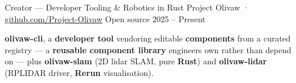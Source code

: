 
\begin{cventries}

  \cventry
  {Creator --- Developer Tooling \& Robotics in Rust}
  {Project Olivaw · \href{https://github.com/Project-Olivaw}{github.com/Project-Olivaw}}
  {Open source}
  {2025 -- Present}
  {
    \begin{cvitems}
      \item {\textbf{olivaw-cli}, a \textbf{developer tool} vendoring editable \textbf{components} from a curated registry --- a \textbf{reusable component library} engineers own rather than depend on --- plus \textbf{olivaw-slam} (2D lidar SLAM, pure \textbf{Rust}) and \textbf{olivaw-lidar} (RPLIDAR driver, \textbf{Rerun} visualisation).}
    \end{cvitems}
  }

\end{cventries}
